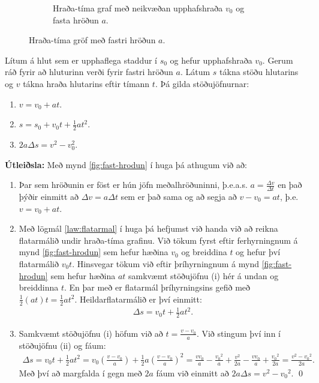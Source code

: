 \begin{figure}[H]
\begin{subfigure}[h]{.4\textwidth}
    \caption{Hraða-tíma graf með neikvæðan upphafshraða $v_0$ og fasta hröðun $a$.}
    \label{fig:neikvaett-hrodun}
\end{subfigure}
\caption{Hraða-tíma gröf með fastri hröðun $a$.}
\end{figure}


\begin{tcolorbox}
\begin{theorem}
Lítum á hlut sem er upphaflega staddur í $s_0$ og hefur upphafshraða $v_0$. Gerum ráð fyrir að hluturinn verði fyrir fastri hröðun $a$. Látum $s$ tákna stöðu hlutarins og $v$ tákna hraða hlutarins eftir tímann $t$. Þá gilda stöðujöfnurnar:

\begin{enumerate}[label = \textbf{(\roman*)}]
    \item $v = v_0 + at$.

    \item $s = s_0 + v_0 t + \frac{1}{2}at^2$.
    
    \item $2a \Delta s = v^2 - v_0^2$.
\end{enumerate}
\end{theorem}
\end{tcolorbox}


\textbf{Útleiðsla:}
Með mynd \ref{fig:fast-hrodun} í huga þá athugum við að:
\begin{enumerate}[label = \textbf{(\roman*)}]
    \item Þar sem hröðunin er föst er hún jöfn meðalhröðuninni, þ.e.a.s. $a = \frac{\Delta v}{\Delta t}$ en það þýðir einmitt að $\Delta v = a \Delta t$ sem er það sama og að segja að $v - v_0 = at$, þ.e. $v = v_0 + at$.
    
    \item Með lögmál \ref{law:flatarmal} í huga þá hefjumst við handa við að reikna flatarmálið undir hraða-tíma grafinu. Við tökum fyrst eftir ferhyrningnum á mynd \ref{fig:fast-hrodun} sem hefur hæðina $v_0$ og breiddina $t$ og hefur því flatarmálið $v_0 t$. Hinsvegar tökum við eftir þríhyrningnum á mynd \ref{fig:fast-hrodun} sem hefur hæðina $at$ samkvæmt stöðujöfnu (i) hér á undan og breiddinna $t$. En þar með er flatarmál þríhyrningsins gefið með $\frac{1}{2} (at) t = \frac{1}{2}at
   ^2$. Heildarflatarmálið er því einmitt:
   \begin{align*}
       \Delta s = v_0 t + \frac{1}{2}at^2.
   \end{align*}
   
   \item Samkvæmt stöðujöfnu (i) höfum við að $t = \frac{v-v_0}{a}$. Við stingum því inn í stöðujöfnu (ii) og fáum:
   \begin{align*}
       \Delta s = v_0 t + \frac{1}{2}a t^2 = v_0 \left( \frac{v-v_0}{a} \right) + \frac{1}{2}a \left( \frac{v-v_0}{a} \right)^2 = \frac{v v_0}{a} -\frac{{v_0}^2}{a} + \frac{v^2}{2a} - \frac{v v_0}{a} + \frac{{v_0}^2}{2a} = \frac{v^2-{v_0}^2}{2a}. 
   \end{align*}
   Með því að margfalda í gegn með $2a$ fáum við einmitt að $2a \Delta s = v^2 - {v_0}^2$. \qed
\end{enumerate}

